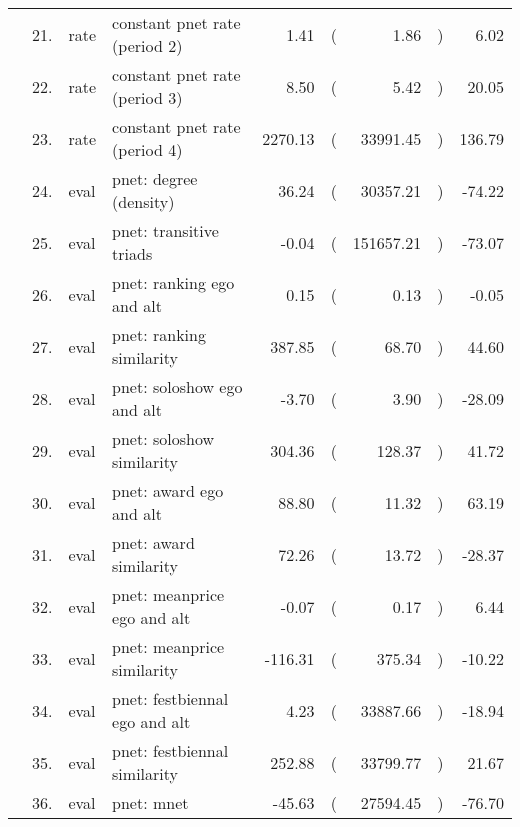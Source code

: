 \begin{table}[ht]
\begin{tabular}{llllrlrlr}
    & 21. & rate & constant pnet rate (period 2) & 1.41 & ( & 1.86 & ) & 6.02 \\ 
    & 22. & rate & constant pnet rate (period 3) & 8.50 & ( & 5.42 & ) & 20.05 \\ 
    & 23. & rate & constant pnet rate (period 4) & 2270.13 & ( & 33991.45 & ) & 136.79 \\ 
    & 24. & eval & pnet: degree (density) & 36.24 & ( & 30357.21 & ) & -74.22 \\ 
    & 25. & eval & pnet: transitive triads & -0.04 & ( & 151657.21 & ) & -73.07 \\ 
    & 26. & eval & pnet: ranking ego and alt & 0.15 & ( & 0.13 & ) & -0.05 \\ 
    & 27. & eval & pnet: ranking similarity & 387.85 & ( & 68.70 & ) & 44.60 \\ 
    & 28. & eval & pnet: soloshow ego and alt & -3.70 & ( & 3.90 & ) & -28.09 \\ 
    & 29. & eval & pnet: soloshow similarity & 304.36 & ( & 128.37 & ) & 41.72 \\ 
    & 30. & eval & pnet: award ego and alt & 88.80 & ( & 11.32 & ) & 63.19 \\ 
    & 31. & eval & pnet: award similarity & 72.26 & ( & 13.72 & ) & -28.37 \\ 
    & 32. & eval & pnet: meanprice ego and alt & -0.07 & ( & 0.17 & ) & 6.44 \\ 
    & 33. & eval & pnet: meanprice similarity & -116.31 & ( & 375.34 & ) & -10.22 \\ 
    & 34. & eval & pnet: festbiennal ego and alt & 4.23 & ( & 33887.66 & ) & -18.94 \\ 
    & 35. & eval & pnet: festbiennal similarity & 252.88 & ( & 33799.77 & ) & 21.67 \\ 
    & 36. & eval & pnet: mnet & -45.63 & ( & 27594.45 & ) & -76.70 \\ 
   \hline
\end{tabular}
\end{table}
